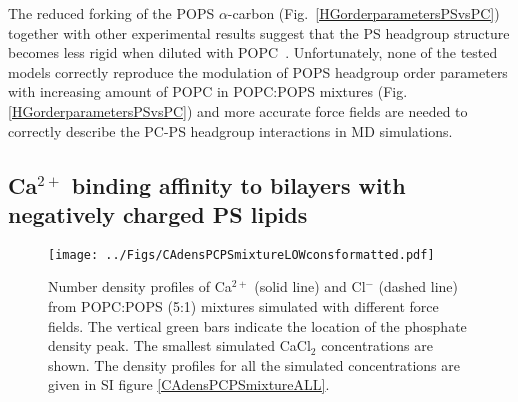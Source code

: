 \documentclass[aps,prl,superscriptaddress,twocolumn]{revtex4}
\begin{document}
The reduced forking of the POPS $\alpha$-carbon (Fig.~\ref{HGorderparametersPSvsPC})
together with other experimental results suggest that the PS headgroup structure becomes less rigid when diluted with
POPC~\cite{browning80,buldt81,roux90,roux91,scherer87}.
Unfortunately, none of the tested models correctly reproduce the modulation of POPS headgroup order
parameters with increasing amount of POPC in POPC:POPS mixtures (Fig. \ref{HGorderparametersPSvsPC})
and more accurate force fields are needed
to correctly describe the PC-PS headgroup interactions in MD simulations.

\subsection{Ca$^{2+}$ binding affinity to bilayers with negatively charged PS lipids}
\begin{figure}[tb]
  \centering
  \texttt{[image: ../Figs/CAdensPCPSmixtureLOWconsformatted.pdf]}
  \caption{\label{CAdensPCPSmixture}
    Number density profiles of Ca$^{2+}$ (solid line) and Cl$^-$ (dashed line) from POPC:POPS (5:1) mixtures
    simulated with different force fields. The vertical green bars indicate the location of the phosphate density peak.
    The smallest simulated CaCl$_2$ concentrations are shown.
    The density profiles for all the simulated concentrations are given in SI figure \ref{CAdensPCPSmixtureALL}.
  }
\end{figure}
\end{document}
